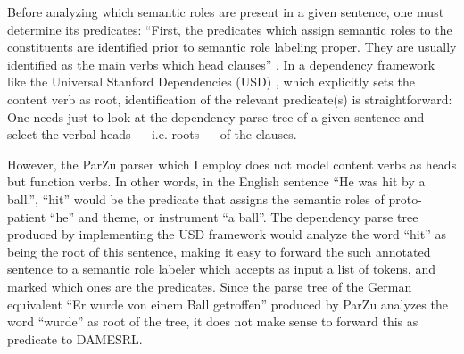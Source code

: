 
Before analyzing which semantic roles are present in a given sentence, one
must determine its predicates: ``First, the predicates which
assign semantic roles to the constituents are identified prior to semantic
role labeling proper. They are usually identified as the main verbs which
head clauses'' \citep[p.~74]{samardzic2013dynamics}. In a dependency framework
like the Universal Stanford Dependencies (USD) \citep{de2014universal},
which explicitly sets the content verb as root, identification of the
relevant predicate(s) is straightforward: One needs just to look at the dependency
parse tree of a given sentence and select the verbal heads --- i.e. roots ---
of the clauses.

However, the ParZu parser \citep{sennrich2009new} which I employ does not model content verbs
as heads but function verbs. In other words, in the English
sentence ``He was hit by a ball.'', ``hit'' would be the predicate that assigns the semantic
roles of proto-patient ``he'' and theme, or instrument ``a ball''. The dependency parse tree
produced by implementing the USD framework would analyze the word ``hit'' as being the root
of this sentence, making it easy to forward the such annotated sentence to a semantic role
labeler which accepts as input a list of tokens, and marked which ones are the predicates.
Since the parse tree of the German equivalent ``Er wurde von einem Ball getroffen'' produced
by ParZu analyzes the word ``wurde'' as root of the tree, it does not make sense to forward
this as predicate to DAMESRL.



